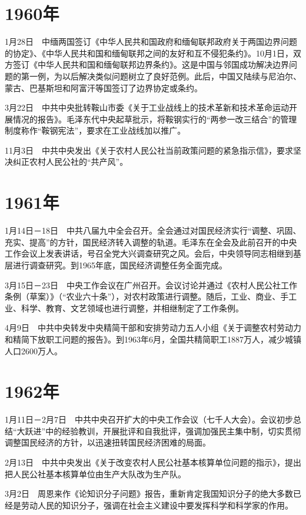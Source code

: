 \documentclass[10pt,a4paper,twocolumn]{book}
\begin{document}
\section{1960年}

1月28日　中缅两国签订《中华人民共和国政府和缅甸联邦政府关于两国边界问题的协定》、《中华人民共和国和缅甸联邦之间的友好和互不侵犯条约》。10月1日，双方签订《中华人民共和国和缅甸联邦边界条约》。这是中国与邻国成功解决边界问题的第一例，为以后解决类似问题树立了良好范例。此后，中国又陆续与尼泊尔、蒙古、巴基斯坦和阿富汗等国签订了边界协定或条约。

3月22日　中共中央批转鞍山市委《关于工业战线上的技术革新和技术革命运动开展情况的报告》。毛泽东代中央起草批示，将鞍钢实行的“两参一改三结合”的管理制度称作“鞍钢宪法”，要求在工业战线加以推广。

11月3日　中共中央发出《关于农村人民公社当前政策问题的紧急指示信》，要求坚决纠正农村人民公社的“共产风”。

\section{1961年}

1月14日－18日　中共八届九中全会召开。全会通过对国民经济实行“调整、巩固、充实、提高”的方针，国民经济转入调整的轨道。毛泽东在全会及此前召开的中央工作会议上发表讲话，号召全党大兴调查研究之风。会后，中央领导同志相继到基层进行调查研究。到1965年底，国民经济调整任务全面完成。

3月15日－23日　中央工作会议在广州召开。会议讨论并通过《农村人民公社工作条例（草案）》（“农业六十条”），对农村政策进行调整。随后，工业、商业、手工业、科学、教育、文艺领域也进行调整，并相继制定了工作条例。

4月9日　中共中央转发中央精简干部和安排劳动力五人小组《关于调整农村劳动力和精简下放职工问题的报告》。到1963年6月，全国共精简职工1887万人，减少城镇人口2600万人。

\section{1962年}

1月11日－2月7日　中共中央召开扩大的中央工作会议（七千人大会）。会议初步总结“大跃进”中的经验教训，开展批评和自我批评，强调加强民主集中制，切实贯彻调整国民经济的方针，以迅速扭转国民经济困难的局面。

2月13日　中共中央发出《关于改变农村人民公社基本核算单位问题的指示》，提出把人民公社基本核算单位由生产大队改为生产队。

3月2日　周恩来作《论知识分子问题》报告，重新肯定我国知识分子的绝大多数已经是劳动人民的知识分子，强调在社会主义建设中要发挥科学和科学家的作用。
\end{document}
